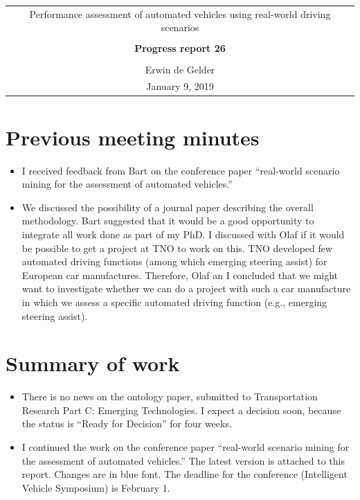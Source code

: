 \documentclass[10pt,final,a4paper,oneside,onecolumn]{article}
\newcommand{\progressreportnumber}{26}
\renewcommand{\author}{Erwin de Gelder}
\renewcommand{\date}{January 9, 2019}
\renewcommand{\title}{Performance assessment of automated vehicles using real-world driving scenarios}
\begin{document}
	
\begin{center}
	\begin{tabular}{c}
		\title \\ \\
		\textbf{\huge Progress report \progressreportnumber} \\ \\
		\author \\ 
		\date
	\end{tabular}
\end{center}

\section{Previous meeting minutes}

\begin{itemize}
	\item I received feedback from Bart on the conference paper ``real-world scenario mining for the assessment of automated vehicles.''
	\item We discussed the possibility of a journal paper describing the overall methodology. Bart suggested that it would be a good opportunity to integrate all work done as part of my PhD. I discussed with Olaf if it would be possible to get a project at TNO to work on this. TNO developed few automated driving functions (among which emerging steering assist) for European car manufactures. Therefore, Olaf an I concluded that we might want to investigate whether we can do a project with such a car manufacture in which we assess a specific automated driving function (e.g., emerging steering assist).
\end{itemize}

\section{Summary of work}

\begin{itemize}
	\item There is no news on the ontology paper, submitted to Transportation Research Part C: Emerging Technologies. I expect a decision soon, because the status is ``Ready for Decision'' for four weeks.
	\item I continued the work on the conference paper ``real-world scenario mining for the assessment of automated vehicles.'' The latest version is attached to this report. Changes are in blue font. The deadline for the conference (Intelligent Vehicle Symposium) is February 1.
\end{itemize}
\end{document}
